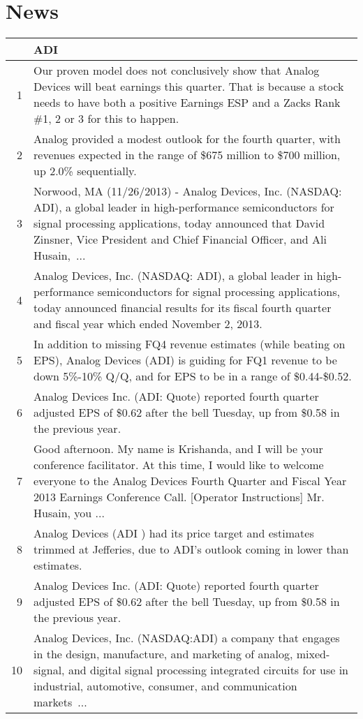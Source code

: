 \documentclass{tufte-handout}\usepackage[]{graphicx}\usepackage[]{color}
\begin{document}
\newpage
\section{News}


\begin{tabularx}{\textwidth}{rX}
  \hline
 & ADI \\ 
  \hline
1 &  Our proven model does not conclusively show that Analog Devices will beat earnings this quarter. That is because a stock needs to have both a positive Earnings ESP and a Zacks Rank \#1, 2 or 3 for this to happen.  \\ 
  2 &  Analog provided a modest outlook for the fourth quarter, with revenues expected in the range of \$675 million to \$700 million, up 2.0\% sequentially.  \\ 
  3 &  Norwood, MA (11/26/2013) - Analog Devices, Inc. (NASDAQ: ADI), a global leader in high-performance semiconductors for signal processing applications, today announced that David Zinsner, Vice President and Chief Financial Officer, and Ali Husain, ...  \\ 
  4 &  Analog Devices, Inc. (NASDAQ: ADI), a global leader in high-performance semiconductors for signal processing applications, today announced financial results for its fiscal fourth quarter and fiscal year which ended November 2, 2013.  \\ 
  5 &  In addition to missing FQ4 revenue estimates (while beating on EPS), Analog Devices (ADI) is guiding for FQ1 revenue to be down 5\%-10\% Q/Q, and for EPS to be in a range of \$0.44-\$0.52.  \\ 
  6 &  Analog Devices Inc. (ADI: Quote) reported fourth quarter adjusted EPS of \$0.62 after the bell Tuesday, up from \$0.58 in the previous year.  \\ 
  7 &  Good afternoon. My name is Krishanda, and I will be your conference facilitator. At this time, I would like to welcome everyone to the Analog Devices Fourth Quarter and Fiscal Year 2013 Earnings Conference Call. [Operator Instructions] Mr. Husain, you ...  \\ 
  8 &  Analog Devices (ADI ) had its price target and estimates trimmed at Jefferies, due to ADI's outlook coming in lower than estimates.  \\ 
  9 &  Analog Devices Inc. (ADI: Quote) reported fourth quarter adjusted EPS of \$0.62 after the bell Tuesday, up from \$0.58 in the previous year.  \\ 
  10 &  Analog Devices, Inc. (NASDAQ:ADI) a company that engages in the design, manufacture, and marketing of analog, mixed-signal, and digital signal processing integrated circuits for use in industrial, automotive, consumer, and communication markets ...  \\ 
   \hline
\end{tabularx}
\end{document}
